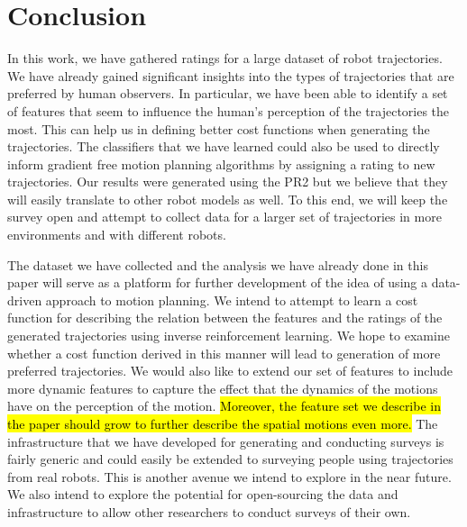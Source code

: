 \documentclass[letterpaper, 10 pt, conference]{ieeeconf}  %
\begin{document}
\section{Conclusion}
\label{sec:conclusion}
In this work, we have gathered ratings for a large dataset of robot trajectories. We have already gained significant insights into the 
types of trajectories that are preferred by human observers. In particular, we have been able to identify a set of features that seem to influence 
the human's perception of the trajectories the most. This can help us in defining better cost functions when generating the trajectories. The classifiers 
that we have learned could also be used to directly inform gradient free motion planning algorithms by assigning a rating to new trajectories. Our 
results were generated using the PR2 but we believe that they will easily translate to other robot models as well. To this end, 
we will keep the survey open and attempt to collect data for a larger set of trajectories in 
more environments and with different robots. 

The dataset we have collected and the analysis we have already done in this paper will serve as a
 platform for further development of the idea of using 
a data-driven approach to motion planning. We intend to attempt to learn a cost function for describing the relation between the features and 
the ratings of the generated trajectories using inverse reinforcement learning. We hope to examine whether a cost function derived in this manner will 
lead to generation of more preferred trajectories. We would also like to extend our set of features to include more dynamic features to capture the effect 
that the dynamics of the motions have on the perception of the motion. \hl{Moreover, the feature set we describe in the paper should grow to further describe the spatial motions even more.} The infrastructure that we have developed for generating and conducting 
surveys is fairly generic and could easily be extended to surveying people using trajectories from real robots. This is another avenue we intend to explore 
in the near future. We also intend to explore the potential for open-sourcing the data and infrastructure to allow other researchers to conduct surveys of their own. 

\end{document}
